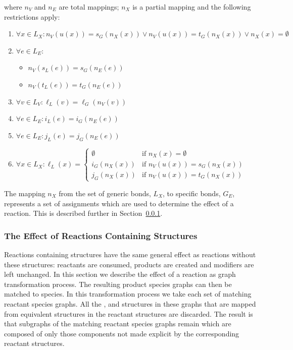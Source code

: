 \documentclass{cekarticle}
\begin{document}
where $n_{V}$ and $n_{E}$ are total mappings; $n_{X}$ is a partial
mapping and the following restrictions apply:

\begin{enumerate}

\item $\forall x \in L_{X} : n_{V}(u(x)) = s_{G}(n_{X}(x)) \vee
n_{V}(u(x)) = t_{G}(n_{X}(x)) \vee n_{X}(x) = \emptyset$

\item $\forall e \in L_{E} : $
    \begin{itemize}
    \item $n_{V}(s_{L}(e))= s_{G}(n_{E}(e))$
    \item $n_{V}(t_{L}(e))= t_{G}(n_{E}(e))$
    \end{itemize}
\item $\forall v \in L_{V} : \ell_{L}(v) = \ell_{G}(n_{V}(v))$

\item $\forall e \in L_{E} : i_{L}(e) = i_{G}(n_{E}(e))$

\item $\forall e \in L_{E} : j_{L}(e) = j_{G}(n_{E}(e))$

\item $ \forall x \in L_{X} : \ell_{L}(x) = \left\{
\begin{array}{ll}
\emptyset & \mbox{if $n_{X}(x) = \emptyset $}\\
i_{G}(n_{X}(x)) & \mbox{if $n_{V}(u(x)) = s_{G}(n_{X}(x))$}\\
j_{G}(n_{X}(x)) & \mbox{if $n_{V}(u(x)) = t_{G}(n_{X}(x))$}
\end{array} \right. $
\end{enumerate}

The mapping $n_{X}$ from the set of generic bonds, $L_{X}$, to
specific bonds, $G_{E}$, represents a set of assignments which are
used to determine the effect of a reaction. This is described
further in Section~\ref{sec:effect-of-reactions}.

\subsubsection{The Effect of Reactions Containing  Structures}
\label{sec:effect-of-reactions}

Reactions containing  structures have the same
general effect as reactions without these structures: reactants
are consumed, products are created and modifiers are left
unchanged. In this section we describe the effect of a reaction as
graph transformation process. The resulting product species graphs
can then be matched to species. In this transformation process we
take each set of matching reactant species graphs. All the
,  and
 structures in these graphs that are mapped
from equivalent structures in the reactant
 structures are discarded. The result is
that subgraphs of the matching reactant species graphs remain
which are composed of only those components not made explicit by
the corresponding reactant  structures.
\end{document}
